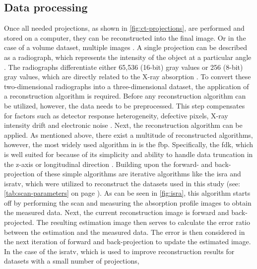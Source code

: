 \subsection{Data processing}\label{s:b-mct-processing}
Once all needed projections, as shown in \cref{fig:ct-projections}, are performed and stored on a computer, they can be reconstructed into the final image.
Or in the case of a volume dataset, multiple images \cite{liMicrocomputedTomographySmall2008,orhanMicrocomputedTomographyMicroCT2020}.
A single projection can be described as a radiograph, which represents the intensity of the object at a particular angle \cite{liMicrocomputedTomographySmall2008,orhanMicrocomputedTomographyMicroCT2020}.
The radiographs differentiate either 65,536 (16-\gls{bit}) gray values or 256 (8-\gls{bit}) gray values, which are directly related to the X-ray absorption \cite{liMicrocomputedTomographySmall2008,orhanMicrocomputedTomographyMicroCT2020}.
To convert these two-dimensional radiographs into a three-dimensional dataset, the application of a reconstruction algorithm is required.
Before any reconstruction algorithm can be utilized, however, the data needs to be preprocessed.
This step compensates for factors such as detector response heterogeneity, defective pixels, X-ray intensity drift and electronic noise \cite{liMicrocomputedTomographySmall2008}.
Next, the reconstruction algorithm can be applied.
As mentioned above, there exist a multitude of reconstructed algorithms, however,
the most widely used algorithm in \mct\space is the \acrfull{fbp}.
Specifically, the \acrfull{fdk}, which is well suited for \mct\space because of its simplicity
and ability to handle data truncation in the z-axis or longitudinal direction \cite{liMicrocomputedTomographySmall2008,orhanMicrocomputedTomographyMicroCT2020}.
Building upon the forward- and back-projection of these simple algorithms are iterative algorithms like the \gls{isra} and \gls{isratv},
which were utilized to reconstruct the datasets used in this study (see: \cref{tab:scan-parameters} on page \pageref{tab:scan-parameters}).
As can be seen in \cref{fig:isra}, this algorithm starts off by performing the scan and measuring the absorption profile images to obtain the measured data.
Next, the current reconstruction image is forward and back-projected.
The resulting estimation image then serves to calculate the error ratio between the estimation and the measured data.
The error is then considered in the next iteration of forward and back-projection to update the estimated image.
In the case of the \gls{isratv}, which is used to improve reconstruction results for datasets with a small number of projections,
